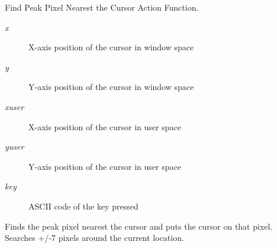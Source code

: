 Find Peak Pixel Nearest the Cursor Action Function. 

\begin{Desc}
\item[Parameters:]
\begin{description}
\item[{\em x}]X-axis position of the cursor in window space \item[{\em y}]Y-axis position of the cursor in window space \item[{\em xuser}]X-axis position of the cursor in user space \item[{\em yuser}]Y-axis position of the cursor in user space \item[{\em key}]ASCII code of the key pressed\end{description}
\end{Desc}
Finds the peak pixel nearest the cursor and puts the cursor on that pixel. Searches +/-7 pixels around the current location. 